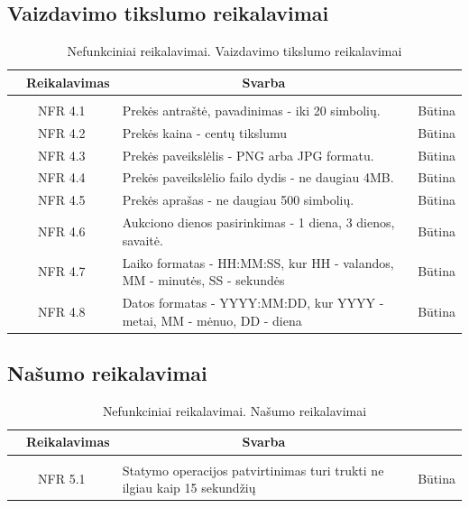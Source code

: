 \documentclass{VUMIFPSkursinis}
\begin{document}
\subsection{Vaizdavimo tikslumo reikalavimai}
\begin{table}[H]
	\caption{Nefunkciniai reikalavimai. Vaizdavimo tikslumo reikalavimai}
	\begin{tabular}{|p{1cm}|p{1cm}|p{}|p{}|}
		\hline 
		\rowcolor{gray!50}
		\multicolumn{2}{|c|}{{\bfseries Kodas}}&
		\multicolumn{1}{c|}{{\bfseries Reikalavimas}}&
		\multicolumn{1}{c|}{{\bfseries Svarba}}\\
		\hline
		\rowcolor{lightgray}
		\multicolumn{4}{|c|}{Vaizdavimo tikslumo reikalvimai}\\				
		\hline
		\multicolumn{2}{|c|}{NFR 4.1}&
		{Prekės antraštė, pavadinimas - iki 20 simbolių.}&		
		\multicolumn{1}{c|}{Būtina}\\
		\hline
		\multicolumn{2}{|c|}{NFR 4.2}&
		{Prekės kaina - centų tikslumu}&		
		\multicolumn{1}{c|}{Būtina}\\
		\hline
		\multicolumn{2}{|c|}{NFR 4.3}&
		{Prekės paveikslėlis - PNG arba JPG formatu.}&		
		\multicolumn{1}{c|}{Būtina}\\
		\hline
		\multicolumn{2}{|c|}{NFR 4.4}&
		{Prekės paveikslėlio failo dydis - ne daugiau 4MB.}&		
		\multicolumn{1}{c|}{Būtina}\\
		\hline
		\multicolumn{2}{|c|}{NFR 4.5}&
		{Prekės aprašas - ne daugiau 500 simbolių.}&		
		\multicolumn{1}{c|}{Būtina}\\
		\hline
		\multicolumn{2}{|c|}{NFR 4.6}&
		{Aukciono dienos pasirinkimas - 1 diena, 3 dienos, savaitė.}&		
		\multicolumn{1}{c|}{Būtina}\\
		\hline
		\multicolumn{2}{|c|}{NFR 4.7}&
		{Laiko formatas - HH:MM:SS, kur HH - valandos, MM - minutės, SS - sekundės}&	
		\multicolumn{1}{c|}{Būtina}\\
		\hline
		\multicolumn{2}{|c|}{NFR 4.8}&
		{Datos formatas - YYYY:MM:DD, kur YYYY - metai, MM - mėnuo, DD - diena}&	
		\multicolumn{1}{c|}{Būtina}\\
		\hline
	\end{tabular}		
\end{table}

\subsection{Našumo reikalavimai}
\begin{table}[H]
	\caption{Nefunkciniai reikalavimai. Našumo reikalavimai}
	\begin{tabular}{|p{1cm}|p{1cm}|p{}|p{}|}
		\hline 
		\rowcolor{gray!50}
		\multicolumn{2}{|c|}{{\bfseries Kodas}}&
		\multicolumn{1}{c|}{{\bfseries Reikalavimas}}&
		\multicolumn{1}{c|}{{\bfseries Svarba}}\\
		\hline
		\rowcolor{lightgray}
		\multicolumn{4}{|c|}{Našumo reikalvimai}\\				
		\hline
		\multicolumn{2}{|c|}{NFR 5.1}&
		{Statymo operacijos patvirtinimas turi trukti ne ilgiau kaip 15 sekundžių}&	
		\multicolumn{1}{c|}{Būtina}\\
		\hline
	\end{tabular}		
\end{table}
\end{document}
